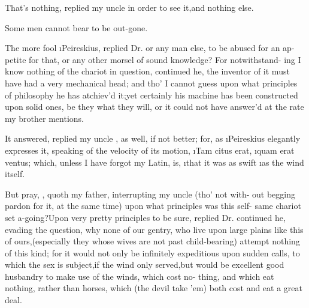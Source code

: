 \documentclass[twoside]{article}
\begin{document}
\tsk That’s nothing, replied my uncle 
in order to see it,\tsk and nothing else.

Some men cannot bear to be out-gone.

The more fool \i{Peireskius}, replied Dr.
or any man else, to be abused for an ap-
petite for that, or any other morsel of
sound knowledge? For notwithstand-\break
ing I know nothing of the chariot in\break
question, continued he, the inventor of it must have had a very mechanical head;\break
and tho’ I cannot guess upon what prin\-ciples of philosophy he has atchiev’d\break
it;\tsh yet certainly his machine has\break
been constructed upon solid ones, be\break
they what they will, or it could not\break
have answer’d at the rate my brother\break
mentions.

It answered, replied my uncle \toby,\break
as well, if not better; for, as \i{Peireskius}\break
elegantly expresses it, speaking of the\break
velocity of its motion, \i{Tam citus erat},\break
\i{quam erat ventus}; which, unless I have\break
forgot my Latin, is, \i{that it was as swift}\break 
\i{as the wind itself}.

But pray, \drslop, quoth my father,\break
interrupting my uncle (tho’ not with-\break
out begging pardon for it, at the same
time) upon what principles was this self-\break
same chariot set a-going?\tsk Upon very pretty principles to be sure, replied
Dr.\break
{}\break
continued he, evading
the question, why none of our gentry, who live upon large plains
like this of ours,\tsk (especially they whose wives are not past
child-bearing) attempt nothing of this kind; for it\break
would not only be infinitely expeditious\break
upon sudden calls, to which the sex is\break
subject,\tsk if the wind only served,\tsk but\break 
would be excellent good husbandry to\break
make use of the winds, which cost no-\break
thing, and which eat nothing, rather\break
than horses, which (the devil take ’em)\break 
both cost and eat a great deal.
\end{document}
